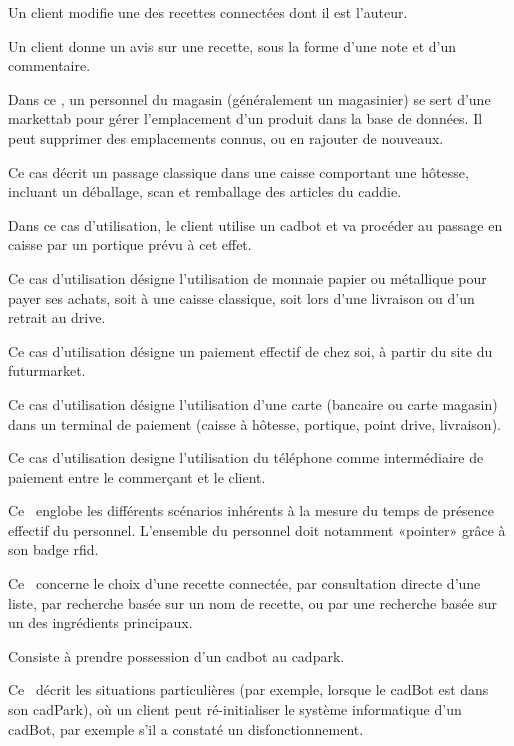 Un client modifie une des recettes connectées dont il est l'auteur.

Un client donne un avis sur une recette, sous la forme d'une note et d'un commentaire.

Dans ce \cu, un personnel du magasin (généralement un magasinier) se sert d'une markettab pour gérer l'emplacement d'un produit dans la base de données.
Il peut supprimer des emplacements connus, ou en rajouter de nouveaux.

Ce cas décrit un passage classique dans une caisse comportant une hôtesse, incluant un déballage, scan et remballage des articles du caddie.

Dans ce cas d'utilisation, le client utilise un cadbot et va procéder au passage en caisse par un portique prévu à cet effet. 

Ce cas d'utilisation désigne l'utilisation de monnaie papier ou métallique pour payer ses achats, soit à une caisse classique, soit lors d'une livraison ou d'un retrait au drive.

Ce cas d'utilisation désigne un paiement effectif de chez soi, à partir du site du futurmarket.

Ce cas d'utilisation désigne l'utilisation d'une carte (bancaire ou carte magasin) dans un terminal de paiement (caisse à hôtesse, portique, point drive, livraison).

Ce cas d'utilisation designe l'utilisation du téléphone comme intermédiaire de paiement entre le commerçant et le client. 

Ce \cu\ englobe les différents scénarios inhérents à la mesure du temps de présence effectif du personnel.
L'ensemble du personnel doit notamment «pointer» grâce à son badge rfid.

Ce \cu\ concerne le choix d'une recette connectée, par consultation directe d'une liste, par recherche basée sur un nom de recette, ou par une recherche basée sur un des ingrédients principaux.

Consiste à prendre possession d'un cadbot au cadpark.

Ce \cu\ décrit les situations particulières (par exemple, lorsque le cadBot est dans son cadPark), où un client peut ré-initialiser le système informatique d'un cadBot, par exemple s'il a constaté un disfonctionnement.


